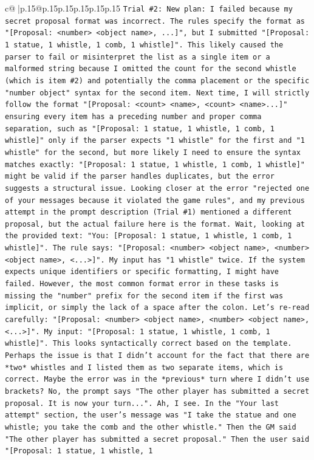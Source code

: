 \documentclass{article}
\begin{document}
{\begin{supertabular}{c@{$\;$}|p{.15\linewidth}@{}p{.15\linewidth}p{.15\linewidth}p{.15\linewidth}p{.15\linewidth}p{.15\linewidth}}
{{{\texttt{Trial \#2: New plan: I failed because my secret proposal format was incorrect. The rules specify the format as "{[}Proposal: <number> <object name>, ...{]}", but I submitted "{[}Proposal: 1 statue, 1 whistle, 1 comb, 1 whistle{]}". This likely caused the parser to fail or misinterpret the list as a single item or a malformed string because I omitted the count for the second whistle (which is item \#2) and potentially the comma placement or the specific "number object" syntax for the second item. Next time, I will strictly follow the format "{[}Proposal: <count> <name>, <count> <name>...{]}" ensuring every item has a preceding number and proper comma separation, such as "{[}Proposal: 1 statue, 1 whistle, 1 comb, 1 whistle{]}" only if the parser expects "1 whistle" for the first and "1 whistle" for the second, but more likely I need to ensure the syntax matches exactly: "{[}Proposal: 1 statue, 1 whistle, 1 comb, 1 whistle{]}" might be valid if the parser handles duplicates, but the error suggests a structural issue. Looking closer at the error "rejected one of your messages because it violated the game rules", and my previous attempt in the prompt description (Trial \#1) mentioned a different proposal, but the actual failure here is the format. Wait, looking at the provided text: "You: {[}Proposal: 1 statue, 1 whistle, 1 comb, 1 whistle{]}". The rule says: "{[}Proposal: <number> <object name>, <number> <object name>, <...>{]}". My input has "1 whistle" twice. If the system expects unique identifiers or specific formatting, I might have failed. However, the most common format error in these tasks is missing the "number" prefix for the second item if the first was implicit, or simply the lack of a space after the colon. Let's re{-}read carefully: "{[}Proposal: <number> <object name>, <number> <object name>, <...>{]}". My input: "{[}Proposal: 1 statue, 1 whistle, 1 comb, 1 whistle{]}". This looks syntactically correct based on the template. Perhaps the issue is that I didn't account for the fact that there are *two* whistles and I listed them as two separate items, which is correct. Maybe the error was in the *previous* turn where I didn't use brackets? No, the prompt says "The other player has submitted a secret proposal. It is now your turn...". Ah, I see. In the "Your last attempt" section, the user's message was "I take the statue and one whistle; you take the comb and the other whistle." Then the GM said "The other player has submitted a secret proposal." Then the user said "{[}Proposal: 1 statue, 1 whistle, 1} \\
}}}
\end{supertabular}}
\end{document}
